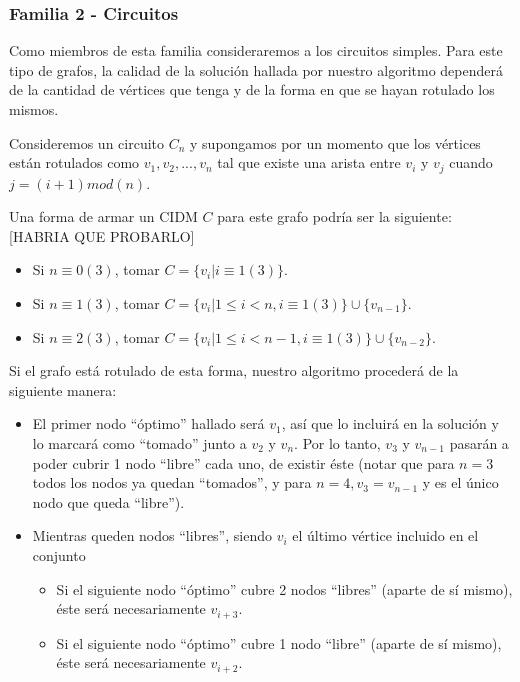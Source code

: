 \subsubsection*{Familia 2 - Circuitos}

Como miembros de esta familia consideraremos a los circuitos simples.  Para este tipo de grafos, la calidad de la solución hallada por nuestro algoritmo dependerá de la cantidad de vértices que tenga y de la forma en que se hayan rotulado los mismos.

Consideremos un circuito $C_{n}$ y supongamos por un momento que los vértices están rotulados como $v_1,v_2,...,v_n$ tal que existe una arista entre $v_i$ y $v_j$ cuando $j = (i+1) mod (n)$.

Una forma de armar un CIDM $C$ para este grafo podría ser la siguiente: [HABRIA QUE PROBARLO]

\begin{itemize}
\item Si $n \equiv 0 (3)$, tomar $C = \{v_i | i \equiv 1 (3)\}$.
\item Si $n \equiv 1 (3)$, tomar $C = \{v_i | 1 \leq i < n, i \equiv 1 (3)\} \cup \{v_{n-1}\}$.
\item Si $n \equiv 2 (3)$, tomar $C = \{v_i | 1 \leq i < n-1, i \equiv 1 (3)\} \cup \{v_{n-2}\}$.
\end{itemize}

Si el grafo está rotulado de esta forma, nuestro algoritmo procederá de la siguiente manera:

\begin{itemize}
\item El primer nodo ``óptimo'' hallado será $v_1$, así que lo incluirá en la solución y lo marcará como ``tomado'' junto a $v_2$ y $v_n$. Por lo tanto, $v_3$ y $v_{n-1}$ pasarán a poder cubrir 1 nodo ``libre'' cada uno, de existir éste (notar que para $n = 3$ todos los nodos ya quedan ``tomados'', y para $n = 4, v_3 = v_{n-1}$ y es el único nodo que queda ``libre'').
\item Mientras queden nodos ``libres'', siendo $v_i$ el último vértice incluido en el conjunto

	\begin{itemize}
	\item Si el siguiente nodo ``óptimo'' cubre 2 nodos ``libres'' (aparte de sí mismo), éste será necesariamente $v_{i+3}$.
	\item Si el siguiente nodo ``óptimo'' cubre 1 nodo ``libre'' (aparte de sí mismo), éste será necesariamente $v_{i+2}$.
	\end{itemize}

\end{itemize}

